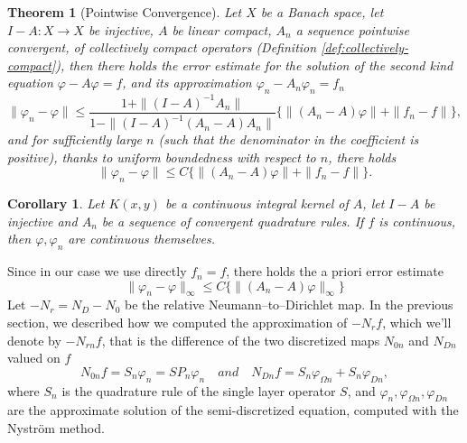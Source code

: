 \documentclass[10pt, a4paper, twoside, openright]{book}
\theoremstyle{definition}
\theoremstyle{plain}
\newtheorem{theorem}[subsection]{Theorem}
\theoremstyle{plain}
\newtheorem{corollary}[subsection]{Corollary}
\theoremstyle{plain}
\theoremstyle{plain}
\theoremstyle{plain}
\theoremstyle{plain}
\theoremstyle{plain}
\theoremstyle{plain}
\let\phi\varphi
\begin{document}
\begin{theorem}[Pointwise Convergence]
 Let $X$ be a Banach space, let $I-A:X\to X$ be injective, $A$ be linear compact, $A_n$ a sequence \emph{pointwise convergent}, of \emph{collectively compact} operators (Definition \ref{def:collectively-compact}), 
 then there holds the error estimate for the solution of the second kind equation $\phi-A\phi=f$, and its approximation $\phi_n - A_n\phi_n=f_n$
 \begin{equation}
  \|\phi_n - \phi \| \leq \frac{1 + \|(I-A)^{-1}A_n\|}{1-\|(I-A)^{-1}(A_n-A)A_n\|}\{\|(A_n - A)\phi\| + \| f_n - f\|\},
 \end{equation}
 and for sufficiently large $n$ (such that the denominator in the coefficient is positive), thanks to uniform boundedness with respect to $n$, there holds      
 \begin{equation}
  \|\phi_n - \phi \| \leq C\{\|(A_n - A)\phi\| + \| f_n - f\|\}.
 \end{equation}
\end{theorem}
\begin{corollary}
 Let $K(x,y)$ be a continuous integral kernel of $A$, let $I-A$ be injective and $A_n$ be a sequence of convergent quadrature rules. 
 If $f$ is continuous, then $\phi,\phi_n$ are continuous themselves. 
\end{corollary}
Since in our case we use directly $f_n=f$, there holds the a priori error estimate
 \begin{equation}
  \|\phi_n - \phi \|_{\infty} \leq C\{\|(A_n - A)\phi\|_{\infty}\}
 \end{equation}
Let $-N_r=N_D - N_0$ be the relative Neumann--to--Dirichlet map. In the previous section, we described
how we computed the approximation of $-{N_r}f$, which we'll denote by $-{N_{rn}}f$, that is the difference 
of the two discretized maps $N_{0n}$ and $N_{Dn}$ valued on $f$
\begin{equation}
 {N_{0n}}f = S_n\phi_n = SP_n\phi_n\quad and \quad{N_{Dn}}f = S_n\phi_{\Omega n} + S_n\phi_{D n},
\end{equation}
where $S_n$ is the quadrature rule of the single layer operator $S$, and 
$\phi_n, \phi_{\Omega n}, \phi_{Dn}$ 
are the approximate solution of the semi-discretized equation, computed with the Nystr\"{o}m method.
\end{document}
